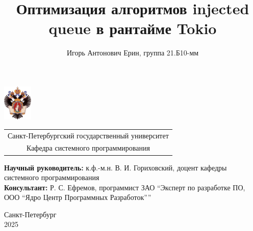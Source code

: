 \documentclass{beamer}
\title[Tokio global queue]{Оптимизация алгоритмов injected queue в
рантайме Tokio}
\institute[СПбГУ]{}
\author[Игорь Ерин]{Игорь Антонович Ерин, группа 21.Б10-мм}
\begin{document}
{
\begin{frame}
  \includegraphics[width=1.4cm]{pictures/SPbGU_Logo.png}
\vspace{-35pt}
\hspace{-10pt}
\begin{center}
   \begin{tabular}{c}
        \scriptsize{Санкт-Петербургский государственный университет} \\
        \scriptsize{Кафедра системного программирования}
    \end{tabular}
\titlepage
\end{center}

\btVFill

{\scriptsize
   \textbf{Научный руководитель:} к.ф.-м.н. В. И. Гориховский, доцент кафедры системного программирования \\
   \textbf{Консультант:}  Р. С. Ефремов, программист ЗАО \enquote{Эксперт по разработке ПО, ООО ``Ядро Центр Программных Разработок''}\\
 }
\begin{center}
  \vspace{5pt}
  \scriptsize{Санкт-Петербург\\
                 2025}
  \end{center}

\end{frame}
}
\end{document}
